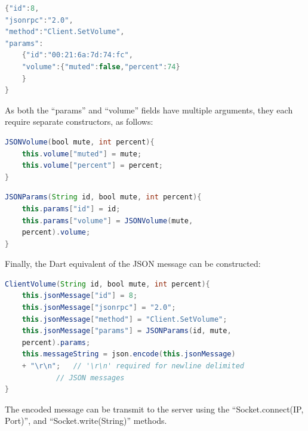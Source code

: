 \documentclass[11pt,a4paper,headinclude=false,footinclude=false]{scrreprt}
\begin{document}
\lstset{
    caption=Example Snapcast "Client.SetVolume" Request,
    basicstyle=\footnotesize, frame=tb,
    xleftmargin=.2\textwidth, xrightmargin=.2\textwidth
}

\begin{lstlisting}[language=Java]
{"id":8,
"jsonrpc":"2.0",
"method":"Client.SetVolume",
"params":
    {"id":"00:21:6a:7d:74:fc",
    "volume":{"muted":false,"percent":74}
    }
}
\end{lstlisting}

As both the ``params'' and ``volume'' fields have multiple arguments,
they each require separate constructors, as follows:

\lstset{
    caption=Dart JSON "volume" Field Constructor,
    basicstyle=\footnotesize, frame=tb,
    xleftmargin=.2\textwidth, xrightmargin=.2\textwidth
}

\begin{lstlisting}[language=Java]
JSONVolume(bool mute, int percent){
    this.volume["muted"] = mute;
    this.volume["percent"] = percent;
}
\end{lstlisting}

\lstset{
    caption=Dart JSON "params" Field Constructor,
    basicstyle=\footnotesize, frame=tb,
    xleftmargin=.2\textwidth, xrightmargin=.2\textwidth
}

\begin{lstlisting}[language=Java]
JSONParams(String id, bool mute, int percent){
    this.params["id"] = id;
    this.params["volume"] = JSONVolume(mute,
    percent).volume;
}
\end{lstlisting}

Finally, the Dart equivalent of the JSON message can be constructed:

\lstset{
    caption=Dart JSON Client.SetVolume Constructor,
    basicstyle=\footnotesize, frame=tb,
    xleftmargin=.2\textwidth, xrightmargin=.2\textwidth
}

\begin{lstlisting}[language=Java]
ClientVolume(String id, bool mute, int percent){
    this.jsonMessage["id"] = 8;
    this.jsonMessage["jsonrpc"] = "2.0";
    this.jsonMessage["method"] = "Client.SetVolume";
    this.jsonMessage["params"] = JSONParams(id, mute,
    percent).params;
    this.messageString = json.encode(this.jsonMessage)
    + "\r\n";   // '\r\n' required for newline delimited
            // JSON messages
}
\end{lstlisting}

The encoded message can be transmit to the server using the
``Socket.connect(IP, Port)'', and ``Socket.write(String)'' methods.
\end{document}
